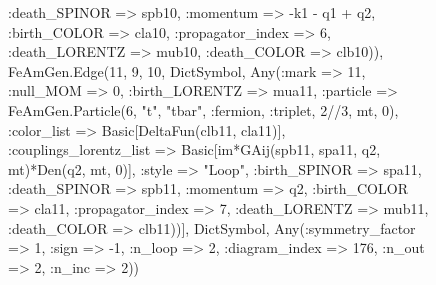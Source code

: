 \documentclass{revtex4}
\begin{document}
\begin{figure}[!htb]
\begin{center}
{:death_SPINOR => spb10, :momentum => -k1 - q1 + q2, :birth_COLOR => cla10, :propagator_index => 6, :death_LORENTZ => mub10, :death_COLOR => clb10)), FeAmGen.Edge(11, 9, 10, Dict{Symbol, Any}(:mark => 11, :null_MOM => 0, :birth_LORENTZ => mua11, :particle => FeAmGen.Particle(6, "t", "tbar", :fermion, :triplet, 2//3, mt, 0), :color_list => Basic[DeltaFun(clb11, cla11)], :couplings_lorentz_list => Basic[im*GAij(spb11, spa11, q2, mt)*Den(q2, mt, 0)], :style => "Loop", :birth_SPINOR => spa11, :death_SPINOR => spb11, :momentum => q2, :birth_COLOR => cla11, :propagator_index => 7, :death_LORENTZ => mub11, :death_COLOR => clb11))], Dict{Symbol, Any}(:symmetry_factor => 1, :sign => -1, :n_loop => 2, :diagram_index => 176, :n_out => 2, :n_inc => 2)) 
}
\end{center}
\end{figure}
\end{document}
